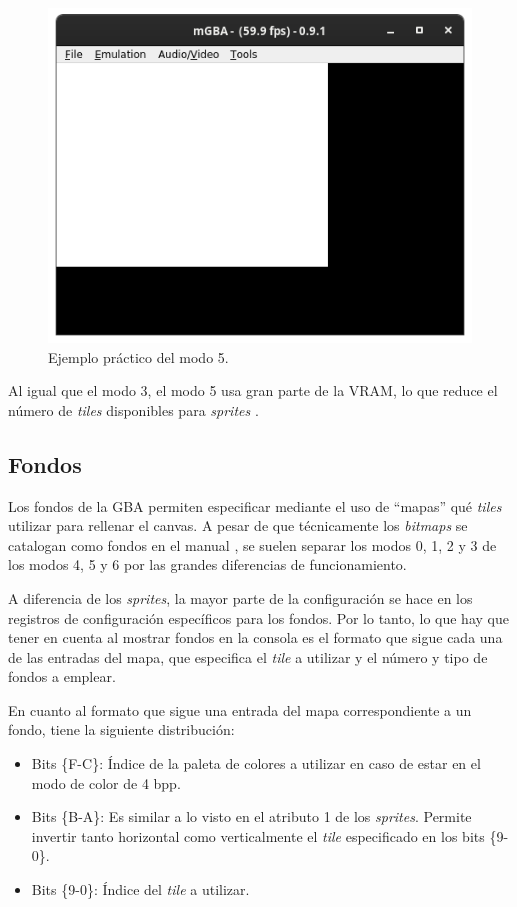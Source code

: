 \begin{figure}[h]
	\centering
	\includegraphics[width=.55\textwidth]{capitulos/capitulo3/bitmaps_5.png}
	\caption{Ejemplo práctico del modo 5.}
	\label{fig:modo_5}
\end{figure}
\FloatBarrier

Al igual que el modo 3, el modo 5 usa gran parte de la VRAM, lo que reduce el número de \textit{tiles} disponibles para \textit{sprites} \cite{bib:tonc}.

\subsection{Fondos}\label{sec:fondos}
Los fondos de la GBA permiten especificar mediante el uso de ``mapas'' qué \textit{tiles} utilizar para rellenar el canvas. A pesar de que técnicamente los \textit{bitmaps} se catalogan como fondos en el manual \cite{bib:gba_manual}, se suelen separar los modos 0, 1, 2 y 3 de los modos 4, 5 y 6 por las grandes diferencias de funcionamiento.

A diferencia de los \textit{sprites}, la mayor parte de la configuración se hace en los registros de configuración específicos para los fondos. Por lo tanto, lo que hay que tener en cuenta al mostrar fondos en la consola es el formato que sigue cada una de las entradas del mapa, que especifica el \textit{tile} a utilizar y el número y tipo de fondos a emplear.

En cuanto al formato que sigue una entrada del mapa correspondiente a un fondo, tiene la siguiente distribución:

\begin{itemize}
	\item Bits \{F-C\}: Índice de la paleta de colores a utilizar en caso de estar en el modo de color de 4 bpp.
	\item Bits \{B-A\}: Es similar a lo visto en el atributo 1 de los \textit{sprites}. Permite invertir tanto horizontal como verticalmente el \textit{tile} especificado en los bits \{9-0\}.
	\item Bits \{9-0\}: Índice del \textit{tile} a utilizar.
\end{itemize}

